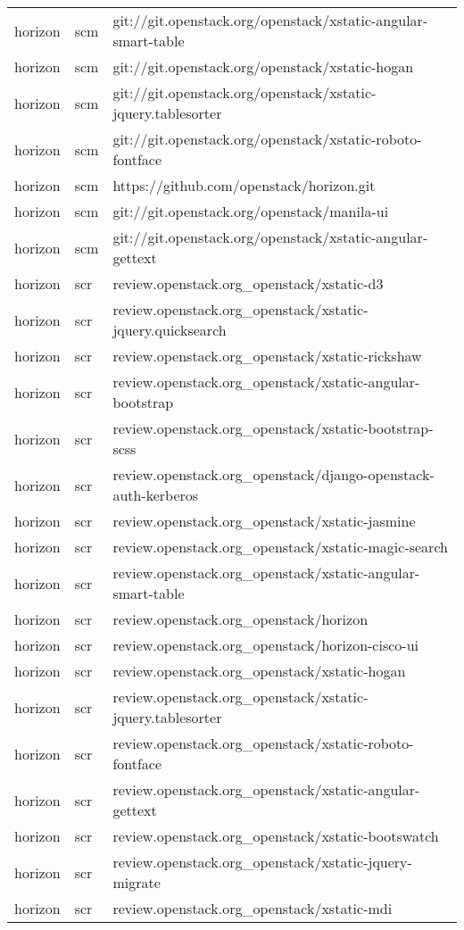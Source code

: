 \begin{center}
\begin{longtable}{|p{4cm}|p{1cm}|p{10cm}|}
horizon&scm&git://git.openstack.org/openstack/xstatic-angular-smart-table\\ 
horizon&scm&git://git.openstack.org/openstack/xstatic-hogan\\ 
horizon&scm&git://git.openstack.org/openstack/xstatic-jquery.tablesorter\\ 
horizon&scm&git://git.openstack.org/openstack/xstatic-roboto-fontface\\ 
horizon&scm&https://github.com/openstack/horizon.git\\ 
horizon&scm&git://git.openstack.org/openstack/manila-ui\\ 
horizon&scm&git://git.openstack.org/openstack/xstatic-angular-gettext\\ 
horizon&scr&review.openstack.org\_openstack/xstatic-d3\\ 
horizon&scr&review.openstack.org\_openstack/xstatic-jquery.quicksearch\\ 
horizon&scr&review.openstack.org\_openstack/xstatic-rickshaw\\ 
horizon&scr&review.openstack.org\_openstack/xstatic-angular-bootstrap\\ 
horizon&scr&review.openstack.org\_openstack/xstatic-bootstrap-scss\\ 
horizon&scr&review.openstack.org\_openstack/django-openstack-auth-kerberos\\ 
horizon&scr&review.openstack.org\_openstack/xstatic-jasmine\\ 
horizon&scr&review.openstack.org\_openstack/xstatic-magic-search\\ 
horizon&scr&review.openstack.org\_openstack/xstatic-angular-smart-table\\ 
horizon&scr&review.openstack.org\_openstack/horizon\\ 
horizon&scr&review.openstack.org\_openstack/horizon-cisco-ui\\ 
horizon&scr&review.openstack.org\_openstack/xstatic-hogan\\ 
horizon&scr&review.openstack.org\_openstack/xstatic-jquery.tablesorter\\ 
horizon&scr&review.openstack.org\_openstack/xstatic-roboto-fontface\\ 
horizon&scr&review.openstack.org\_openstack/xstatic-angular-gettext\\ 
horizon&scr&review.openstack.org\_openstack/xstatic-bootswatch\\ 
horizon&scr&review.openstack.org\_openstack/xstatic-jquery-migrate\\ 
horizon&scr&review.openstack.org\_openstack/xstatic-mdi\\ 

\end{longtable}
\end{center}
